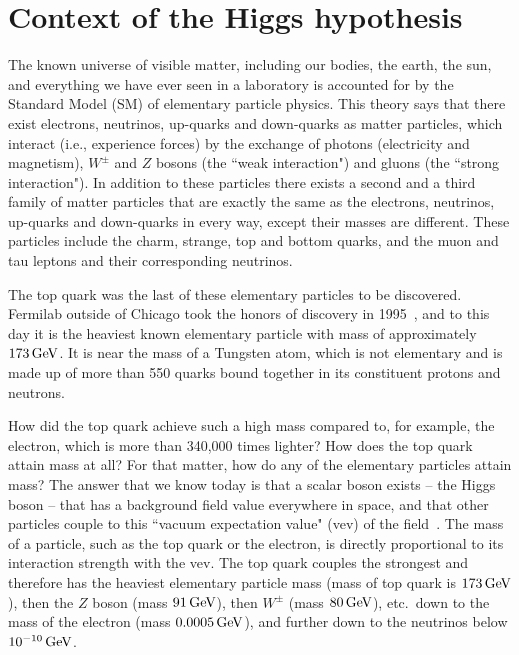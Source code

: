 \documentclass[letter,12pt]{article}
\def\gev{\, {\rm GeV}}
\begin{document}
\section{Context of the Higgs hypothesis}
\label{sec:context}

The known universe of visible matter, including our bodies, the earth, the sun, and everything we have ever seen in a laboratory is accounted for by the Standard Model (SM) of elementary particle physics. This theory says that there exist electrons, neutrinos, up-quarks and down-quarks as matter particles, which interact (i.e., experience forces) by the exchange of photons (electricity and magnetism), $W^{\pm}$ and $Z$ bosons (the ``weak interaction") and gluons (the ``strong interaction"). In addition to these particles there exists a second and a third family of matter particles that are exactly the same as the electrons, neutrinos, up-quarks and down-quarks in every way, except their masses are different. These particles include the charm, strange, top and bottom quarks, and the muon and tau leptons and their corresponding neutrinos.

The top quark was the last of these elementary particles to be discovered. Fermilab outside of Chicago took the honors of discovery in 1995~\cite{Abe:1995hr,Abachi:1994td}, and to this day it is the heaviest known elementary particle with mass of approximately $173\gev$. It is  near the mass of a Tungsten atom, which is not elementary and is made up of more  than 550 quarks bound together in its constituent protons and neutrons.

How did the top quark achieve such a high mass compared to, for example, the electron, which is more than 340,000 times lighter? How does the top quark  attain mass at all? For that matter, how do any of the elementary particles attain mass?  The answer that we know today is that a scalar boson exists -- the Higgs boson -- that has a background field value everywhere in space, and that other particles couple to this ``vacuum expectation value" (vev) of the field~\cite{Wells:2009kq}. 
The mass of a particle, such as the top quark or the electron, is directly proportional to its interaction strength with the vev. The top quark couples the strongest and therefore has the heaviest elementary particle mass (mass of top quark is $173\gev$), then the $Z$ boson (mass $91\gev$), then $W^\pm$ (mass $80\gev$), etc.\ down to the mass of the electron (mass $0.0005\gev$), and further down to the neutrinos below $10^{-10}\gev$. 
\end{document}
